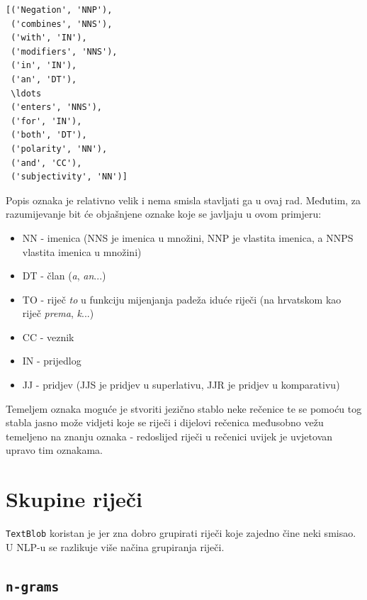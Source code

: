 \documentclass[10pt]{foi}
\makeatletter
\newcommand{\boxspacing}{\kern\kvtcb@left@rule\kern\kvtcb@boxsep}
\newcommand{\prompt}[4]{
        \ttfamily\llap{{\color{#2}[#3]:\hspace{3pt}#4}}\vspace{-\baselineskip}
    }
\makeatother
\begin{document}
            \begin{tcolorbox}[breakable, size=fbox, boxrule=.5pt, pad at break*=1mm, opacityfill=0]
\prompt{Out}{outcolor}{6}{\boxspacing}
\begin{Verbatim}[commandchars=\\\{\}]
[('Negation', 'NNP'),
 ('combines', 'NNS'),
 ('with', 'IN'),
 ('modifiers', 'NNS'),
 ('in', 'IN'),
 ('an', 'DT'),
 \ldots
 ('enters', 'NNS'),
 ('for', 'IN'),
 ('both', 'DT'),
 ('polarity', 'NN'),
 ('and', 'CC'),
 ('subjectivity', 'NN')]
\end{Verbatim}
\end{tcolorbox}

Popis oznaka je relativno velik i nema smisla stavljati ga u ovaj rad. Međutim,
za razumijevanje bit će objašnjene oznake koje se javljaju u ovom primjeru:

\begin{itemize}
	\item NN - imenica (NNS je imenica u množini, NNP je vlastita imenica,
		a NNPS vlastita imenica u množini)
	\item DT - član (\textit{a}, \textit{an}...)
	\item TO - riječ \textit{to} u funkciju mijenjanja padeža iduće riječi
		(na hrvatskom kao riječ \textit{prema}, \textit{k}...)
	\item CC - veznik
	\item IN - prijedlog
	\item JJ - pridjev (JJS je pridjev u superlativu, JJR je pridjev u
		komparativu)
\end{itemize}

Temeljem oznaka moguće je stvoriti jezično stablo neke rečenice te se pomoću
tog stabla jasno može vidjeti koje se riječi i dijelovi rečenica međusobno vežu
temeljeno na znanju oznaka - redoslijed riječi u rečenici uvijek je uvjetovan
upravo tim oznakama.

\section{Skupine riječi}

\texttt{TextBlob} koristan je jer zna dobro grupirati riječi koje zajedno čine
neki smisao. U NLP-u se razlikuje više načina grupiranja riječi.

\subsection{\texttt{n-grams}}
\end{document}
